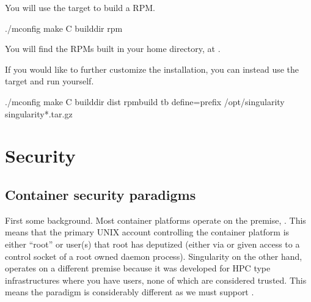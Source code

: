 \documentclass[letterpaper,10pt,english]{sphinxmanual}
\begin{document}
You will use the   target to build a  RPM.

%
\begin{sphinxVerbatim}[commandchars=\\\{\}]
\PYGZdl{} ./mconfig
\PYGZdl{} make \PYGZhy{}C builddir rpm
\end{sphinxVerbatim}

You will find the  RPMs built in your home directory,
at .

If you would like to further customize the  installation,
you can instead use the   target and run 
yourself.

%
\begin{sphinxVerbatim}[commandchars=\\\{\}]
\PYGZdl{} ./mconfig
\PYGZdl{} make \PYGZhy{}C builddir dist
\PYGZdl{} rpmbuild \PYGZhy{}tb \PYGZhy{}\PYGZhy{}define=\PYGZdq{}\PYGZus{}prefix /opt/singularity\PYGZdq{} singularity\PYGZhy{}*.tar.gz
\end{sphinxVerbatim}


\chapter{Security}
\label{\detokenize{security:security}}\label{\detokenize{security:id1}}\label{\detokenize{security::doc}}

\section{Container security paradigms}
\label{\detokenize{security:container-security-paradigms}}
First some background. Most container platforms operate on the
premise, . This means that
the primary UNIX account controlling the container platform is either
“root” or user(s) that root has deputized (either via  or given access
to a control socket of a root owned daemon process).
Singularity on the other hand, operates on a different premise because
it was developed for HPC type infrastructures where you have users,
none of which are considered trusted. This means the paradigm is
considerably different as we must support .
\end{document}
